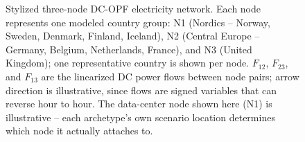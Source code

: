 \documentclass[preprint,12pt]{elsarticle}
\begin{document}
\begin{figure}[H]
\centering
{}
\caption{Stylized three-node DC-OPF electricity network. Each node represents one modeled country group: N1 (Nordics -- Norway, Sweden, Denmark, Finland, Iceland), N2 (Central Europe -- Germany, Belgium, Netherlands, France), and N3 (United Kingdom); one representative country is shown per node. $F_{12}$, $F_{23}$, and $F_{13}$ are the linearized DC power flows between node pairs; arrow direction is illustrative, since flows are signed variables that can reverse hour to hour. The data-center node shown here (N1) is illustrative -- each archetype's own scenario location determines which node it actually attaches to.}
\label{fig:nodal-power}
\end{figure}
\end{document}
